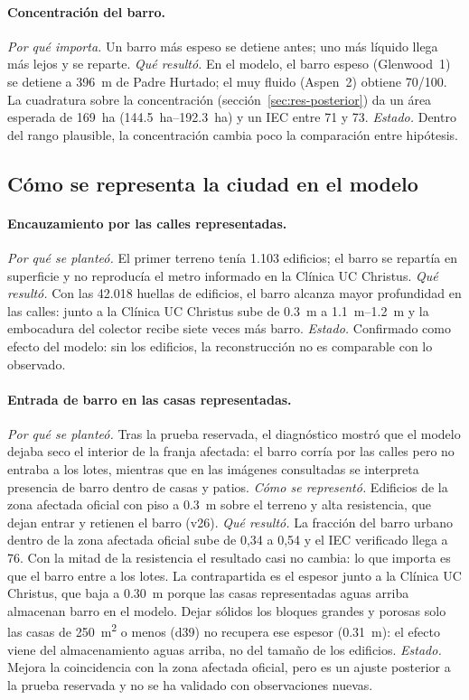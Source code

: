 \paragraph{Concentración del barro.} \emph{Por qué importa.} Un barro más espeso se detiene antes; uno más líquido llega más lejos y se reparte. \emph{Qué resultó.} En el modelo, el barro espeso (Glenwood~1) se detiene a \SI{396}{m} de Padre Hurtado; el muy fluido (Aspen~2) obtiene 70/100. La cuadratura sobre la concentración (sección~\ref{sec:res-posterior}) da un área esperada de \SI{169}{ha} (\SIrange{144,5}{192,3}{ha}) y un IEC entre 71 y 73. \emph{Estado.} Dentro del rango plausible, la concentración cambia poco la comparación entre hipótesis.

\subsection{Cómo se representa la ciudad en el modelo}
\paragraph{Encauzamiento por las calles representadas.} \emph{Por qué se planteó.} El primer terreno tenía 1.103 edificios; el barro se repartía en superficie y no reproducía el metro informado en la Clínica UC Christus. \emph{Qué resultó.} Con las 42.018 huellas de edificios, el barro alcanza mayor profundidad en las calles: junto a la Clínica UC Christus sube de \SI{0,3}{m} a \SIrange{1,1}{1,2}{m} y la embocadura del colector recibe siete veces más barro. \emph{Estado.} Confirmado como efecto del modelo: sin los edificios, la reconstrucción no es comparable con lo observado.

\paragraph{Entrada de barro en las casas representadas.} \emph{Por qué se planteó.} Tras la prueba reservada, el diagnóstico mostró que el modelo dejaba seco el interior de la franja afectada: el barro corría por las calles pero no entraba a los lotes, mientras que en las imágenes consultadas se interpreta presencia de barro dentro de casas y patios. \emph{Cómo se representó.} Edificios de la zona afectada oficial con piso a \SI{0,3}{m} sobre el terreno y alta resistencia, que dejan entrar y retienen el barro (v26). \emph{Qué resultó.} La fracción del barro urbano dentro de la zona afectada oficial sube de 0,34 a 0,54 y el IEC verificado llega a 76. Con la mitad de la resistencia el resultado casi no cambia: lo que importa es que el barro entre a los lotes. La contrapartida es el espesor junto a la Clínica UC Christus, que baja a \SI{0,30}{m} porque las casas representadas aguas arriba almacenan barro en el modelo. Dejar sólidos los bloques grandes y porosas solo las casas de \SI{250}{m^2} o menos (d39) no recupera ese espesor (\SI{0,31}{m}): el efecto viene del almacenamiento aguas arriba, no del tamaño de los edificios.
\emph{Estado.} Mejora la coincidencia con la zona afectada oficial, pero es un ajuste posterior a la prueba reservada y no se ha validado con observaciones nuevas.

